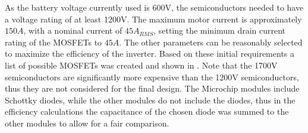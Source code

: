 As the battery voltage currently used is 600V, the semiconductors needed to have a voltage rating of at least 1200V. The maximum motor current is approximately $150A$, with a nominal current of $45A_{RMS}$, setting the minimum drain current rating of the MOSFETs to $45A$. The other parameters can be reasonably selected to maximize the efficiency of the inverter. Based on these initial requirements a list of possible MOSFETs was created and shown in . Note that the 1700V semiconductors are significantly more expensive than the 1200V semiconductors, thus they are not considered for the final design.  The Microchip modules include Schottky diodes, while the other modules do not include the diodes, thus in the efficiency calculations the capacitance of the chosen diode was summed to the other modules to allow for a fair comparison.

